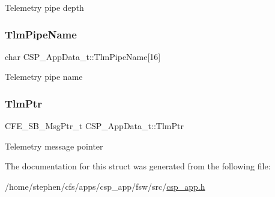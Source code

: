 Telemetry pipe depth \mbox{\label{structCSP__AppData__t_a32b2129a2ffc12c7defdfef952592c66}} 
\subsubsection{\texorpdfstring{Tlm\+Pipe\+Name}{TlmPipeName}}
{\footnotesize\ttfamily char C\+S\+P\+\_\+\+App\+Data\+\_\+t\+::\+Tlm\+Pipe\+Name\mbox{[}16\mbox{]}}

Telemetry pipe name \mbox{\label{structCSP__AppData__t_a313b719459ef034ee895674f0062697f}} 
\subsubsection{\texorpdfstring{Tlm\+Ptr}{TlmPtr}}
{\footnotesize\ttfamily C\+F\+E\+\_\+\+S\+B\+\_\+\+Msg\+Ptr\+\_\+t C\+S\+P\+\_\+\+App\+Data\+\_\+t\+::\+Tlm\+Ptr}

Telemetry message pointer 

The documentation for this struct was generated from the following file\+:\begin{DoxyCompactItemize}
\item 
/home/stephen/cfs/apps/csp\+\_\+app/fsw/src/\hyperlink{csp__app_8h}{csp\+\_\+app.\+h}\end{DoxyCompactItemize}
